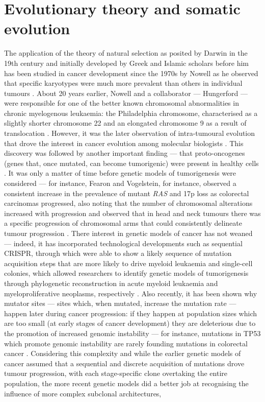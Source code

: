 \section{Evolutionary theory and somatic evolution}

The application of the theory of natural selection as posited by Darwin in the 19th century \cite{Darwin1859-yw} and initially developed by Greek and Islamic scholars before him \cite{noauthor_1898-xh,Zirkle1941-bw} has been studied in cancer development since the 1970s by Nowell as he observed that specific karyotypes were much more prevalent than others in individual tumours \cite{Nowell1976-ob}. About 20 years earlier, Nowell and a collaborator --- Hungerford --- were responsible for one of the better known chromosomal abnormalities in chronic myelogenous leukaemia: the Philadelphia chromosome, characterised as a slightly shorter chromosome 22 and an elongated chromosome 9 as a result of translocation \cite{Nowell2007-ux}. However, it was the later observation of intra-tumoural evolution that drove the interest in cancer evolution among molecular biologists \cite{Cannataro2018-ye}. This discovery was followed by another important finding --- that proto-oncogenes (genes that, once mutated, can become tumorigenic) were present in healthy cells \cite{Stehelin1976-uu,Shih1982-gu}. It was only a matter of time before genetic models of tumorigenesis were considered --- for instance, Fearon and Vogelstein, for instance, observed a consistent increase in the prevalence of mutant \textit{RAS} and 17p loss as colorectal carcinomas progressed, also noting that the number of chromosomal alterations increased with progression \cite{Fearon1990-rk} and  observed that in head and neck tumours there was a specific progression of chromosomal arms that could consistently delineate tumour progression \cite{Califano1996-kj}. There interest in genetic models of cancer has not weaned --- indeed, it has incorporated technological developments such as sequential CRISPR, through which  were able to show a likely sequence of mutation acquisition steps that are more likely to drive myeloid leukaemia \cite{Wang2021-wg} and single-cell colonies, which allowed researchers to identify genetic models of tumorigenesis through phylogenetic reconstruction in acute myeloid leukaemia and myeloproliferative neoplasms, respectively \cite{Morita2020-rq,Williams2020-ji,Van_Egeren2021-tb}. Also recently, it has been shown why mutator sites --- sites which, when mutated, increase the mutation rate --- happen later during cancer progression: if they happen at population sizes which are too small (at early stages of cancer development) they are deleterious due to the promotion of increased genomic instability \cite{Raynes2018-hg} --- for instance, mutations in TP53 which promote genomic instability are rarely founding mutations in colorectal cancer \cite{Kinzler1996-mp}. Considering this complexity and while the earlier genetic models of cancer assumed that a sequential and discrete acquisition of mutations drove tumour progression, with each stage-specific clone overtaking the entire population, the more recent genetic models did a better job at recognising the influence of more complex subclonal architectures, 